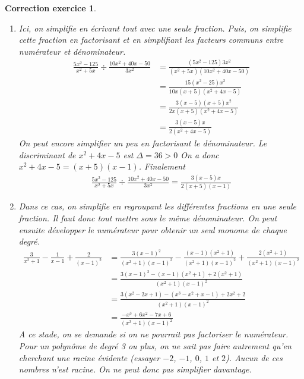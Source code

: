 \documentclass[12pt]{article}
\newtheorem{correction}{\bf Correction exercice}
\newenvironment{cor}{
\begin{correction}\smallskip\normalfont}{\end{correction}
}
\begin{document}
\begin{cor}
\begin{enumerate}
\item Ici, on simplifie en \'ecrivant tout avec une seule fraction.
  Puis, on simplifie cette fraction en factorisant et en simplifiant les facteurs communs
  entre num\'erateur et d\'enominateur.
  \begin{align*}
    \frac{5x^2 - 125}{x^2 + 5x} \div \frac{10x^2 + 40x - 50}{3x^2}
    &= \frac{(5x^2 - 125)3x^2}{(x^2 + 5x)(10x^2 + 40x - 50)}
    \\
    &= \frac{15(x^2 - 25)x^2}{10x(x + 5)(x^2 + 4x - 5)}
    \\
    &= \frac{3(x-5)(x+5)x^2}{2x(x + 5)(x^2 + 4x - 5)}
    \\
    &= \frac{3(x-5)x}{2(x^2 + 4x - 5)}
  \end{align*}
  On peut encore simplifier un peu en factorisant le d\'enominateur.
  Le discriminant de $x^2 + 4x - 5$ est $\Delta = 36 > 0$
  On a donc $x^2 + 4x - 5 = (x+5)(x-1)$.
  Finalement
  \begin{align*}
    \frac{5x^2 - 125}{x^2 + 5x} \div \frac{10x^2 + 40x - 50}{3x^2}
    = \frac{3(x-5)x}{2(x+5)(x-1)}
  \end{align*}
  
\item Dans ce cas, on simplifie en regroupant les diff\'erentes fractions en une seule fraction.
  Il faut donc tout mettre sous le m\^eme d\'enominateur.
  On peut ensuite d\'evelopper le num\'erateur pour obtenir un seul monome de chaque degr\'e.
  \begin{align*}
    \frac{3}{x^2+1} - \frac{1}{x-1} + \frac{2}{(x-1)^2}
    &= \frac{3(x-1)^2}{(x^2+1)(x-1)^2} - \frac{(x-1)(x^2+1)}{(x^2+1)(x-1)^2}
      + \frac{2 (x^2+1)}{(x^2+1)(x-1)^2}
    \\
    &= \frac{3(x-1)^2 - (x-1)(x^2+1) + 2 (x^2 + 1 ) }{(x^2+1)(x-1)^2}
    \\
    &= \frac{3(x^2-2x+1) - (x^3-x^2+x-1) + 2 x^2 + 2}{(x^2+1)(x-1)^2}
    \\
    &= \frac{-x^3 + 6 x^2 - 7 x + 6}{(x^2+1)(x-1)^2}
  \end{align*}
  A ce stade, on se demande si on ne pourrait pas factoriser le num\'erateur.
  Pour un polyn\^ome de degr\'e 3 ou plus, on ne sait pas faire autrement qu'en cherchant
  une racine \'evidente (essayer $-2$, $-1$, $0$, $1$ et $2$).
  Aucun de ces nombres n'est racine. On ne peut donc pas simplifier davantage.


\end{enumerate}
\end{cor}
\end{document}
